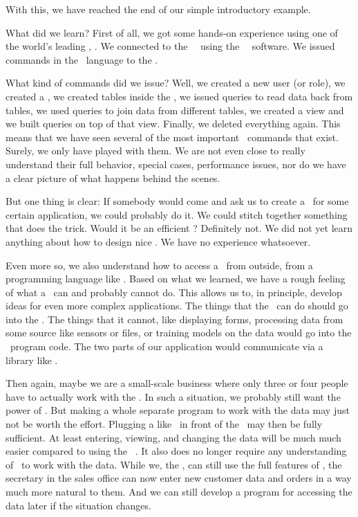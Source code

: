 %
%
%
With this, we have reached the end of our simple introductory example.

What did we learn?
First of all, we got some hands-on experience using one of the world's leading \dbms, \postgresql.
We connected to the \postgresql\ \server\ using the \psql\ \client\ software.
We issued commands in the \sql\ language to the \dbms.

What kind of commands did we issue?
Well, we created a new user (or role), we created a \db, we created tables inside the \db, we issued queries to read data back from tables, we used queries to join data from different tables, we created a view and we built queries on top of that view.
Finally, we deleted everything again.
This means that we have seen several of the most important \sql\ commands that exist.
Surely, we only have played with them.
We are not even close to really understand their full behavior, special cases, performance issues, nor do we have a clear picture of what happens behind the scenes.

But one thing is clear:
If somebody would come and ask us to create a \db\ for some certain application, we could probably do it.
We could stitch together something that does the trick.
Would it be an efficient \db?
Definitely not.
We did not yet learn anything about how to design nice \dbs.
We have no experience whatsoever.

Even more so, we also understand how to access a \db\ from outside, from a programming language like \python.
Based on what we learned, we have a rough feeling of what a \dbms\ can and probably cannot do.
This allows us to, in principle, develop ideas for even more complex applications.
The things that the \dbms\ can do should go into the \db.
The things that it cannot, like displaying forms, processing data from some source like sensors or files, or training  models on the data would go into the \python\ program code.
The two parts of our application would communicate via a library like \psycopg.

Then again, maybe we are a small-scale business where only three or four people have to actually work with the \db.
In such a situation, we probably still want the power of \postgresql.
But making a whole separate program to work with the data may just not be worth the effort.
Plugging a  like \libreofficeBase\ in front of the \db\ may then be fully sufficient.
At least entering, viewing, and changing the data will be much much easier compared to using the \psql\ \client.
It also does no longer require any understanding of \sql\ to work with the data.
While we, the , can still use the full features of \postgresql, the secretary in the sales office can now enter new customer data and orders in a way much more natural to them.
And we can still develop a program for accessing the data later if the situation changes.


